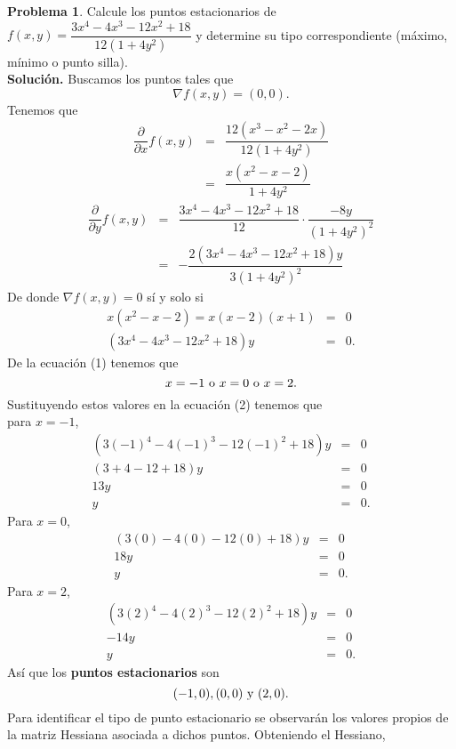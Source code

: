 \documentclass[12pt,letterpaper]{article}
\theoremstyle{definition}
\newtheorem{problm}{Problema}
\begin{document}
\begin{problm}
	Calcule los puntos estacionarios de $ f(x,y) = \dfrac{3x^4 - 4x^3 - 12x^2 + 18}{12(1+4y^2)} $ y determine su tipo correspondiente (máximo, mínimo o punto silla).
	\\
	\textbf{Solución.} Buscamos los puntos tales que 
	\[ \nabla f(x,y) = (0,0). \]
	Tenemos que
	\begin{eqnarray*}
		\dfrac{\partial}{\partial x} f(x,y) & = & \dfrac{12(x^3 - x^2 -2x)}{12(1+4y^2)} \\
											& = & \dfrac{x(x^2 - x -2)}{1+4y^2}
	\end{eqnarray*}
	\begin{eqnarray*}
		\dfrac{\partial}{\partial y} f(x,y) & = & \dfrac{3x^4 - 4 x^3 - 12x^2 +18}{12} \cdot \dfrac{-8y}{(1+4y^2)^2}\\
		& = & - \dfrac{2(3x^4 - 4 x^3 - 12x^2 +18) y}{3(1+4y^2)^2}
	\end{eqnarray*}
	De donde $ \nabla f(x,y) = 0 $ sí y solo si
	\begin{eqnarray}
		x(x^2-x-2) = x(x-2)(x+1) & = & 0 \\
		(3x^4 - 4 x^3 - 12x^2 +18) y & = & 0.
	\end{eqnarray}
	De la ecuación (1) tenemos que
	\[ x = -1 \textup{ o } x = 0 \textup{ o } x = 2. \]
	Sustituyendo estos valores en la ecuación (2) tenemos que
	\\
	para $  x = -1 $,
	\begin{eqnarray*}
		(3(-1)^4 - 4 (-1)^3 - 12 (-1)^2 + 18) y & = & 0 \\
		(3+4-12+18) y & = & 0 \\
		13 y & = & 0 \\
		 y & = & 0.
	\end{eqnarray*}
	Para $ x = 0 $,
	\begin{eqnarray*}
		(3(0) - 4(0) - 12(0) + 18) y & = & 0 \\
		18 y & = & 0 \\
		y & = & 0.
	\end{eqnarray*}
	Para $ x = 2 $, 
	\begin{eqnarray*}
		(3(2)^4 - 4 (2)^3 - 12 (2)^2 + 18) y & = & 0 \\
		-14 y & = & 0 \\
		y & = & 0.
	\end{eqnarray*}
	Así que los \textbf{puntos estacionarios} son
	\[ (-1,0), (0, 0) \textup{ y } (2,0). \]
	Para identificar el tipo de punto estacionario se observarán los valores propios de la matriz Hessiana asociada a dichos puntos. Obteniendo el Hessiano,

\end{problm}
\end{document}
